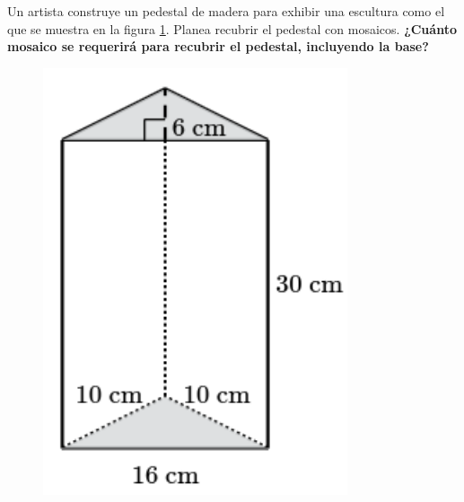 Un artista construye un pedestal de madera para exhibir una escultura como el que se muestra en la figura \ref{fig:prob_verb_superficie_01}.
Planea recubrir el pedestal con mosaicos.
\textbf{¿Cuánto mosaico se requerirá para recubrir el pedestal, incluyendo la base?}

\begin{minipage}{0.3\linewidth}
    \begin{figure}[H]
        \begin{center}
            \includegraphics[width=0.8\textwidth]{../images/prob_verb_superficie_01}
        \end{center}
        \caption{}
        \label{fig:prob_verb_superficie_01}
    \end{figure}
\end{minipage}
\begin{minipage}{0.7\linewidth}
    \begin{solutionbox}{6cm}
    \end{solutionbox}
\end{minipage}